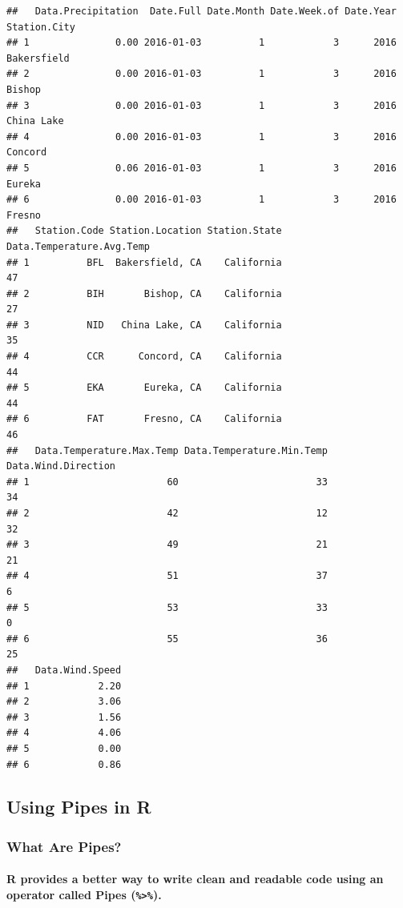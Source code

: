 \documentclass[
]{article}
\let\oldparagraph\paragraph
\renewcommand{\paragraph}[1]{\oldparagraph{#1}\mbox{}}
\begin{document}
\begin{verbatim}
##   Data.Precipitation  Date.Full Date.Month Date.Week.of Date.Year Station.City
## 1               0.00 2016-01-03          1            3      2016  Bakersfield
## 2               0.00 2016-01-03          1            3      2016       Bishop
## 3               0.00 2016-01-03          1            3      2016   China Lake
## 4               0.00 2016-01-03          1            3      2016      Concord
## 5               0.06 2016-01-03          1            3      2016       Eureka
## 6               0.00 2016-01-03          1            3      2016       Fresno
##   Station.Code Station.Location Station.State Data.Temperature.Avg.Temp
## 1          BFL  Bakersfield, CA    California                        47
## 2          BIH       Bishop, CA    California                        27
## 3          NID   China Lake, CA    California                        35
## 4          CCR      Concord, CA    California                        44
## 5          EKA       Eureka, CA    California                        44
## 6          FAT       Fresno, CA    California                        46
##   Data.Temperature.Max.Temp Data.Temperature.Min.Temp Data.Wind.Direction
## 1                        60                        33                  34
## 2                        42                        12                  32
## 3                        49                        21                  21
## 4                        51                        37                   6
## 5                        53                        33                   0
## 6                        55                        36                  25
##   Data.Wind.Speed
## 1            2.20
## 2            3.06
## 3            1.56
## 4            4.06
## 5            0.00
## 6            0.86
\end{verbatim}

\hypertarget{using-pipes-in-r}{%
\subsection{Using Pipes in R}\label{using-pipes-in-r}}

\hypertarget{what-are-pipes}{%
\subsubsection{What Are Pipes?}\label{what-are-pipes}}

\hypertarget{r-provides-a-better-way-to-write-clean-and-readable-code-using-an-operator-called-pipes-.}{%
\paragraph{\texorpdfstring{R provides a better way to write clean and
readable code using an operator called \textbf{Pipes}
(\texttt{\%\textgreater{}\%}).}{R provides a better way to write clean and readable code using an operator called Pipes (\%\textgreater{}\%).}}\label{r-provides-a-better-way-to-write-clean-and-readable-code-using-an-operator-called-pipes-.}}
\end{document}
